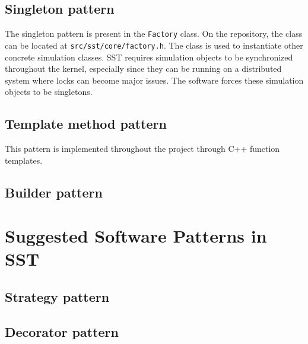\documentclass[titlepage]{article}
\begin{document}
\subsection{Singleton pattern}
The singleton pattern is present in the \texttt{Factory} class. On the repository, the class can be located at \texttt{src/sst/core/factory.h}. The class is used to instantiate other concrete simulation classes. SST requires simulation objects to be synchronized throughout the kernel, especially since they can be running on a distributed system where locks can become major issues. The software forces these simulation objects to be singletons.

\subsection{Template method pattern}
This pattern is implemented throughout the project through C++ function templates.

\subsection{Builder pattern}

\section{Suggested Software Patterns in SST}

\subsection{Strategy pattern}

\subsection{Decorator pattern}



\end{document}
